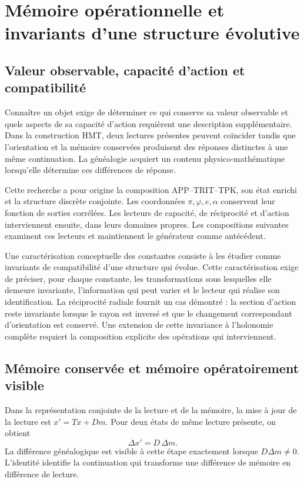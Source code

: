 \section{Mémoire opérationnelle et invariants d'une structure évolutive}
\label{md:lectin:seccion}

\subsection{Valeur observable, capacité d'action et compatibilité}
\label{md:lectin:valor}

Connaître un objet exige de déterminer ce qui conserve sa valeur observable et quels aspects de sa capacité d'action requièrent une description supplémentaire. Dans la construction HMT, deux lectures présentes peuvent coïncider tandis que l'orientation et la mémoire conservées produisent des réponses distinctes à une même continuation. La généalogie acquiert un contenu physico-mathématique lorsqu'elle détermine ces différences de réponse.

Cette recherche a pour origine la composition APP--TRIT--TPK, son état enrichi et la structure discrète conjointe. Les coordonnées $\pi,\varphi,e,\alpha$ conservent leur fonction de sorties corrélées. Les lecteurs de capacité, de réciprocité et d'action interviennent ensuite, dans leurs domaines propres. Les compositions suivantes examinent ces lecteurs et maintiennent le générateur comme antécédent.

Une caractérisation conceptuelle des constantes consiste à les étudier comme invariants de compatibilité d'une structure qui évolue. Cette caractérisation exige de préciser, pour chaque constante, les transformations sous lesquelles elle demeure invariante, l'information qui peut varier et le lecteur qui réalise son identification. La réciprocité radiale fournit un cas démontré : la section d'action reste invariante lorsque le rayon est inversé et que le changement correspondant d'orientation est conservé. Une extension de cette invariance à l'holonomie complète requiert la composition explicite des opérations qui interviennent.

\subsection{Mémoire conservée et mémoire opératoirement visible}
\label{md:lectin:memoria-visible}

Dans la représentation conjointe de la lecture et de la mémoire, la mise à jour de la lecture est $x'=Tx+Dm$. Pour deux états de même lecture présente, on obtient
\begin{equation}
 \Delta x'=D\,\Delta m.
 \label{md:lectin:diferencia-memoria}
\end{equation}
La différence généalogique est visible à cette étape exactement lorsque $D\Delta m\ne0$. L'identité identifie la continuation qui transforme une différence de mémoire en différence de lecture.

